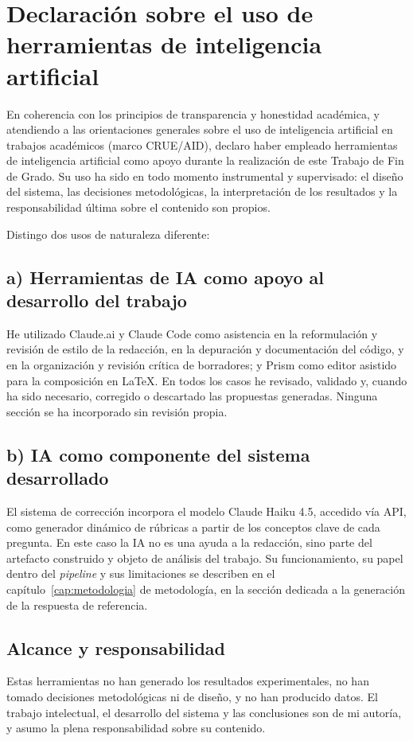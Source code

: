 \chapter*{Declaración sobre el uso de herramientas de inteligencia artificial}

En coherencia con los principios de transparencia y honestidad académica, y atendiendo
a las orientaciones generales sobre el uso de inteligencia artificial en trabajos
académicos (marco CRUE/AID), declaro haber empleado herramientas de inteligencia
artificial como apoyo durante la realización de este Trabajo de Fin de Grado. Su
uso ha sido en todo momento instrumental y supervisado: el diseño del sistema, las
decisiones metodológicas, la interpretación de los resultados y la responsabilidad
última sobre el contenido son propios.

Distingo dos usos de naturaleza diferente:

\section*{a) Herramientas de IA como apoyo al desarrollo del trabajo}

He utilizado Claude.ai y Claude Code como asistencia en la reformulación y revisión
de estilo de la redacción, en la depuración y documentación del código, y en la
organización y revisión crítica de borradores; y Prism como editor asistido para la
composición en \LaTeX. En todos los casos he revisado, validado y, cuando ha sido
necesario, corregido o descartado las propuestas generadas. Ninguna sección se ha
incorporado sin revisión propia.

\section*{b) IA como componente del sistema desarrollado}

El sistema de corrección incorpora el modelo Claude Haiku 4.5, accedido vía API, como
generador dinámico de rúbricas a partir de los conceptos clave de cada pregunta. En
este caso la IA no es una ayuda a la redacción, sino parte del artefacto construido
y objeto de análisis del trabajo. Su funcionamiento, su papel dentro del \emph{pipeline}
y sus limitaciones se describen en el capítulo~\ref{cap:metodologia} de metodología,
en la sección dedicada a la generación de la respuesta de referencia.

\section*{Alcance y responsabilidad}

Estas herramientas no han generado los resultados experimentales, no han tomado
decisiones metodológicas ni de diseño, y no han producido datos. El trabajo
intelectual, el desarrollo del sistema y las conclusiones son de mi autoría, y asumo
la plena responsabilidad sobre su contenido.
